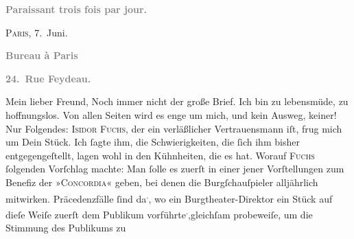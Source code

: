 \begin{ledgroupsized}[t]{13cm}
           \pstart
           \begin{otherlanguage}{french}\textcolor{gray}{\textbf{\textbf{Paraissant trois fois par jour.}}}\end{otherlanguage}\hfill \textsc{Paris}, 7. Juni.\pend
           \pstart
           \begin{otherlanguage}{french}\textcolor{gray}{\textbf{\textbf{Bureau à Paris}}}\end{otherlanguage}\pend
           \pstart
           \begin{otherlanguage}{french}\textcolor{gray}{\textbf{\textbf{24. Rue Feydeau.}}}\end{otherlanguage}\pend
           \pstart\center{}Mein lieber Freund,\pend\pstart
           Noch immer nicht der große Brief. Ich bin zu lebensmüde, zu hoffnungslos. Von allen
               Seiten wird es enge um mich, und kein Ausweg, keiner!\pend
           \pstart
           Nur Folgendes: \textsc{Isidor Fuchs}, der ein verläßlicher Vertrauensmann iſt, frug mich um Dein Stück. Ich ſagte ihm, die Schwierig{\pb}keiten, die ſich ihm bisher entgegengeſtellt, lagen
               wohl in den Kühnheiten, die es hat. Worauf \textsc{Fuchs} ſolgenden Vorſchlag machte: Man ſolle es zuerſt in einer jener Vorſtellungen
               zum Benefiz der »\textsc{Concordia}« geben, bei denen die Burgſchauſpieler alljährlich mitwirken. Präcedenzfälle ſind da\substVorne{}\textsuperscript{.}\substDazwischen{},\substHinten{} wo ein Burgtheater-Direktor ein Stück
               auf dieſe Weiſe zuerſt dem Publikum vorführte\substVorne{}\textsuperscript{.}\substDazwischen{},\substHinten{}{ }{\pb}gleichſam
               probeweiſe, um  die Stimmung des Publikums zu

\end{ledgroupsized}

